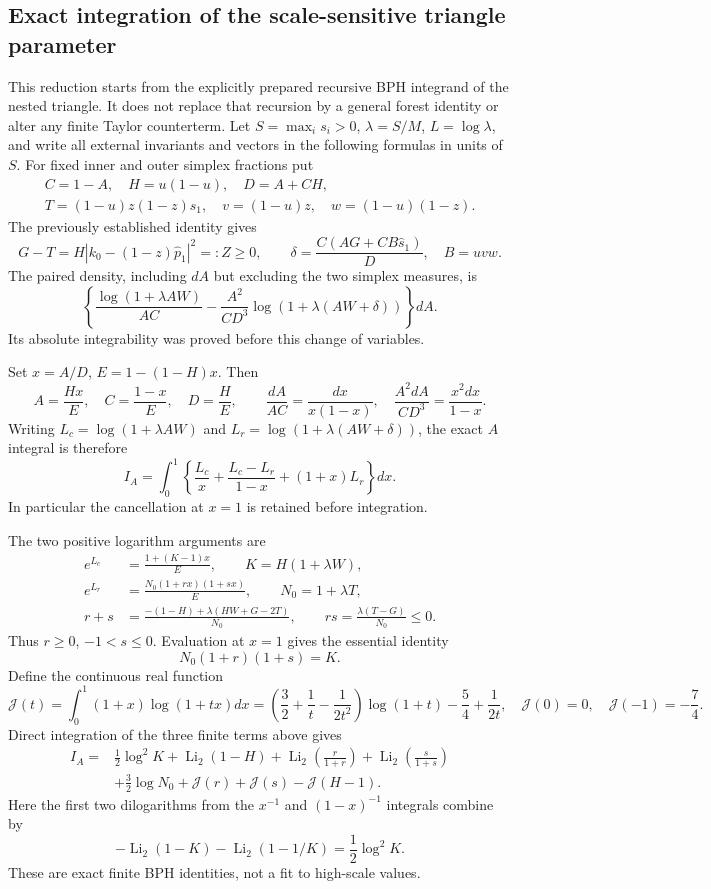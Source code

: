 \subsection{Exact integration of the scale-sensitive triangle parameter}

This reduction starts from the explicitly prepared recursive BPH integrand
of the nested triangle. It does not replace that recursion by a general
forest identity or alter any finite Taylor counterterm. Let
$S=\max_i s_i>0$, $\lambda=S/M$, $L=\log\lambda$, and write all external
invariants and vectors in the following formulas in units of $S$.
For fixed inner and outer simplex fractions put
\[
 \begin{gathered}
 C=1-A,\quad H=u(1-u),\quad D=A+CH,\\
 T=(1-u)z(1-z)\widehat s_1,\quad v=(1-u)z,\quad w=(1-u)(1-z).
 \end{gathered}
\]
The previously established identity gives
\[
 G-T=H\left|k_0-(1-z)\widehat p_1\right|^2=:Z\ge0,
 \qquad
 \delta=\frac{C(AG+CB\widehat s_1)}D,
 \quad B=uvw.
\]
The paired density, including $dA$ but excluding the two simplex measures,
is
\[
 \left\{\frac{\log(1+\lambda AW)}{AC}
 -\frac{A^2}{CD^3}\log(1+\lambda(AW+\delta))\right\}dA.
\]
Its absolute integrability was proved before this change of variables.

Set $x=A/D$, $E=1-(1-H)x$. Then
\[
 A=\frac{Hx}{E},\quad C=\frac{1-x}{E},\quad D=\frac H E,
 \qquad
 \frac{dA}{AC}=\frac{dx}{x(1-x)},\quad
 \frac{A^2dA}{CD^3}=\frac{x^2dx}{1-x}.
\]
Writing $L_c=\log(1+\lambda AW)$ and
$L_r=\log(1+\lambda(AW+\delta))$, the exact $A$ integral is therefore
\[
 I_A=\int_0^1\left\{\frac{L_c}{x}
       +\frac{L_c-L_r}{1-x}+(1+x)L_r\right\}dx.
\]
In particular the cancellation at $x=1$ is retained before integration.

The two positive logarithm arguments are
\begin{align*}
 e^{L_c}&=\frac{1+(K-1)x}{E},\qquad K=H(1+\lambda W),\\
 e^{L_r}&=\frac{N_0(1+rx)(1+sx)}E,\qquad N_0=1+\lambda T,\\
 r+s&=\frac{-(1-H)+\lambda(HW+G-2T)}{N_0},\qquad
 rs=\frac{\lambda(T-G)}{N_0}\le0.
\end{align*}
Thus $r\ge0$, $-1<s\le0$. Evaluation at $x=1$ gives the essential identity
\[
 N_0(1+r)(1+s)=K.
\]
Define the continuous real function
\[
 \mathcal J(t)=\int_0^1(1+x)\log(1+tx)dx
 =\left(\frac32+\frac1t-\frac1{2t^2}\right)\log(1+t)
       -\frac54+\frac1{2t},\quad
 \mathcal J(0)=0,\quad\mathcal J(-1)=-\frac74.
\]
Direct integration of the three finite terms above gives
\begin{align*}
 I_A={}&\frac12\log^2K+\operatorname{Li}_2(1-H)
 +\operatorname{Li}_2\left(\frac r{1+r}\right)
 +\operatorname{Li}_2\left(\frac s{1+s}\right)\\
 &+\frac32\log N_0+\mathcal J(r)+\mathcal J(s)-\mathcal J(H-1).
\end{align*}
Here the first two dilogarithms from the $x^{-1}$ and $(1-x)^{-1}$
integrals combine by
\[
 -\operatorname{Li}_2(1-K)-\operatorname{Li}_2(1-1/K)
 =\frac12\log^2K.
\]
These are exact finite BPH identities, not a fit to high-scale values.

